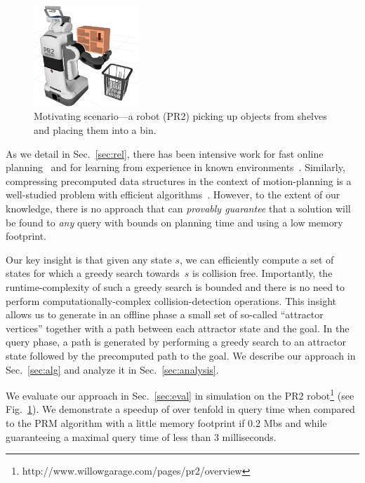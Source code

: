 \documentclass[letterpaper]{article} %
\newcommand{\update}[1]{{\color{magenta}#1}}  %
\begin{document}
\begin{figure}[tb]
  \centering
    \includegraphics[width=0.35\textwidth]{PR2.png}
  \caption{
  Motivating scenario---a robot (PR2) picking up objects from shelves and placing them into a bin.
}
    \label{fig:PR2}
\end{figure}

As we detail in Sec.~\ref{sec:rel}, there has been intensive work 
for fast online planning~\cite{LA18} and 
for learning from experience in known environments~\cite{PCCL12,PDCL13,BAG12,CSMOC15}.
Similarly, compressing precomputed data structures in the context of motion-planning is a well-studied problem with efficient algorithms~\cite{SSAH14,DB14}.
However, to the extent of our knowledge, there is no approach that can \emph{provably guarantee} that a solution will be found to \emph{any} query with bounds on planning time and using a low memory footprint.


\update{
Our key insight is that given any state $s$, we can efficiently compute a set of states for which a greedy search towards~$s$ is collision free.
Importantly, the runtime-complexity of such a greedy search is bounded and there is no need to perform computationally-complex collision-detection operations. 
This insight allows us to generate in an offline phase a small set of so-called ``attractor vertices'' together with a path between each attractor state and the goal.
In the query phase, a path is generated by performing a greedy search to an attractor state followed by the precomputed path to the goal.
We describe our approach in Sec.~\ref{sec:alg} and analyze it in Sec.~\ref{sec:analysis}.
}

We evaluate our approach in Sec.~\ref{sec:eval} in simulation on the PR2 robot\footnote{http://www.willowgarage.com/pages/pr2/overview} (see Fig.~\ref{fig:PR2}).
We demonstrate a speedup of over tenfold in query time when compared to the \textsf{PRM} algorithm with a little memory footprint if 0.2 Mbs and while guaranteeing a maximal query time of less than 3 milliseconds.
\end{document}
